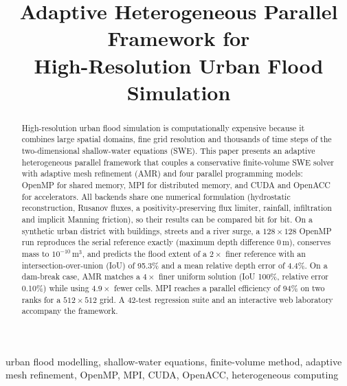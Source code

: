 \documentclass[conference]{IEEEtran}
\begin{document}
\title{Adaptive Heterogeneous Parallel Framework for\\High-Resolution Urban Flood Simulation}

\author{
\and
{}
}

\maketitle

\begin{abstract}
High-resolution urban flood simulation is computationally expensive because it
combines large spatial domains, fine grid resolution and thousands of time
steps of the two-dimensional shallow-water equations (SWE). This paper presents
an adaptive heterogeneous parallel framework that couples a conservative
finite-volume SWE solver with adaptive mesh refinement (AMR) and four parallel
programming models: OpenMP for shared memory, MPI for distributed memory, and
CUDA and OpenACC for accelerators. All backends share one numerical
formulation (hydrostatic reconstruction, Rusanov fluxes, a positivity-preserving
flux limiter, rainfall, infiltration and implicit Manning friction), so their
results can be compared bit for bit. On a synthetic urban district with
buildings, streets and a river surge, a $128\times128$ OpenMP run reproduces the
serial reference exactly (maximum depth difference $0$\,m), conserves mass to
$10^{-10}$\,m$^3$, and predicts the flood extent of a $2\times$ finer reference
with an intersection-over-union (IoU) of 95.3\% and a mean relative depth
error of 4.4\%. On a dam-break case, AMR matches a $4\times$ finer uniform
solution (IoU 100\%, relative error 0.10\%) while using $4.9\times$ fewer cells.
MPI reaches a parallel efficiency of 94\% on two ranks for a $512\times512$
grid. A 42-test regression suite and an interactive web laboratory accompany
the framework.
\end{abstract}

\begin{IEEEkeywords}
urban flood modelling, shallow-water equations, finite-volume method, adaptive
mesh refinement, OpenMP, MPI, CUDA, OpenACC, heterogeneous computing
\end{IEEEkeywords}
\end{document}
